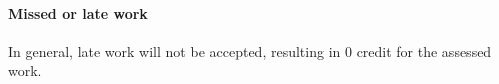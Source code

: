 \paragraph{Missed or late work}
In general, late work will not be accepted, resulting in 0 credit for the assessed work.